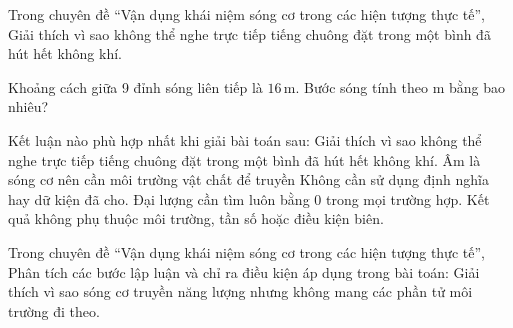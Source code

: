 \begin{ex}
Trong chuyên đề “Vận dụng khái niệm sóng cơ trong các hiện tượng thực tế”, Giải thích vì sao không thể nghe trực tiếp tiếng chuông đặt trong một bình đã hút hết không khí.
\choiceTF

\end{ex}

\begin{ex}
Khoảng cách giữa 9 đỉnh sóng liên tiếp là $16\,\text{m}$. Bước sóng tính theo m bằng bao nhiêu?
\end{ex}

\begin{ex}
Kết luận nào phù hợp nhất khi giải bài toán sau: Giải thích vì sao không thể nghe trực tiếp tiếng chuông đặt trong một bình đã hút hết không khí.
\choice
{\True Âm là sóng cơ nên cần môi trường vật chất để truyền}
{Không cần sử dụng định nghĩa hay dữ kiện đã cho.}
{Đại lượng cần tìm luôn bằng 0 trong mọi trường hợp.}
{Kết quả không phụ thuộc môi trường, tần số hoặc điều kiện biên.}
\end{ex}

\begin{ex}
Trong chuyên đề “Vận dụng khái niệm sóng cơ trong các hiện tượng thực tế”, Phân tích các bước lập luận và chỉ ra điều kiện áp dụng trong bài toán: Giải thích vì sao sóng cơ truyền năng lượng nhưng không mang các phần tử môi trường đi theo.
\choiceTF

\end{ex}

